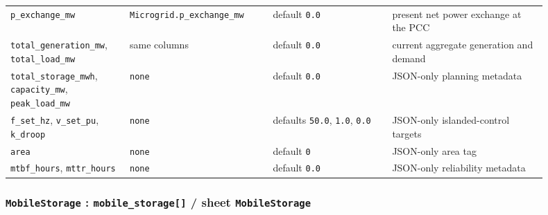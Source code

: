 \begin{longtable}{L{0.20\linewidth}L{0.24\linewidth}L{0.20\linewidth}L{0.26\linewidth}}
\texttt{p\_exchange\_mw} & \texttt{Microgrid.p\_exchange\_mw} & default \texttt{0.0} & present net power exchange at the PCC \\
\texttt{total\_generation\_mw}, \texttt{total\_load\_mw} & same columns & default \texttt{0.0} & current aggregate generation and demand \\
\texttt{total\_storage\_mwh}, \texttt{capacity\_mw}, \texttt{peak\_load\_mw} & \texttt{none} & default \texttt{0.0} & JSON-only planning metadata \\
\texttt{f\_set\_hz}, \texttt{v\_set\_pu}, \texttt{k\_droop} & \texttt{none} & defaults \texttt{50.0}, \texttt{1.0}, \texttt{0.0} & JSON-only islanded-control targets \\
\texttt{area} & \texttt{none} & default \texttt{0} & JSON-only area tag \\
\texttt{mtbf\_hours}, \texttt{mttr\_hours} & \texttt{none} & default \texttt{0.0} & JSON-only reliability metadata \\
\bottomrule
\end{longtable}

\subsubsection*{\texttt{MobileStorage} : \texttt{mobile\_storage[]} / sheet \texttt{MobileStorage}}

